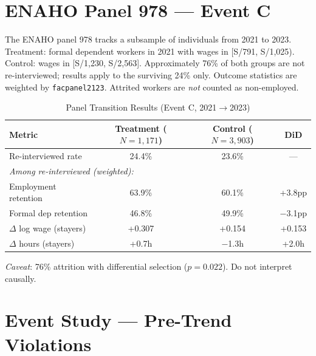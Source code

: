 \documentclass[12pt]{article}
\begin{document}
\newpage
\begin{appendices}

\section{ENAHO Panel 978 --- Event C}\label{app:panel}

The ENAHO panel 978 tracks a subsample of individuals from 2021 to 2023. Treatment: formal dependent workers in 2021 with wages in [S/791, S/1,025). Control: wages in [S/1,230, S/2,563]. Approximately 76\% of both groups are not re-interviewed; results apply to the surviving 24\% only. Outcome statistics are weighted by \texttt{facpanel2123}. Attrited workers are \textit{not} counted as non-employed.

\begin{table}[H]
\centering
\caption{Panel Transition Results (Event C, 2021$\to$2023)}
\label{tab:panel}
\begin{threeparttable}
\small
\begin{tabular}{lccc}
\toprule
Metric & Treatment ($N = 1{,}171$) & Control ($N = 3{,}903$) & DiD \\
\midrule
Re-interviewed rate & 24.4\% & 23.6\% & --- \\
\multicolumn{4}{l}{\textit{Among re-interviewed (weighted):}} \\
\quad Employment retention & 63.9\% & 60.1\% & +3.8pp \\
\quad Formal dep retention & 46.8\% & 49.9\% & $-$3.1pp \\
\quad $\Delta$ log wage (stayers) & +0.307 & +0.154 & +0.153 \\
\quad $\Delta$ hours (stayers) & +0.7h & $-$1.3h & +2.0h \\
\bottomrule
\end{tabular}
\begin{tablenotes}
\small
\item \textit{Caveat}: 76\% attrition with differential selection ($p = 0.022$). Do not interpret causally.
\end{tablenotes}
\end{threeparttable}
\end{table}

\section{Event Study --- Pre-Trend Violations}\label{app:eventstudy}


\end{appendices}
\end{document}
